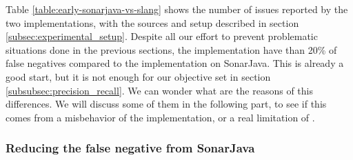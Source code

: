 Table \ref{table:early-sonarjava-vs-slang} shows the number of issues reported by the two implementations, with the sources and setup described in section \ref{subsec:experimental_setup}. 
Despite all our effort to prevent problematic situations done in the previous sections, the implementation have than 20\% of false negatives compared to the implementation on SonarJava. This is already a good start, but it is not enough for our objective set in section \ref{subsubsec:precision_recall}.
We can wonder what are the reasons of this differences.
We will discuss some of them in the following part, to see if this comes from a misbehavior of the implementation, or a real limitation of \slang{}.

\subsubsection{Reducing the false negative from SonarJava}
\label{subsec:reducing_false_positive_sonarjava}

